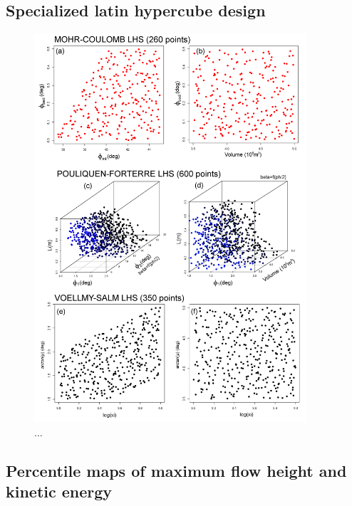 \documentclass{article}
\begin{document}
\subsection{Specialized latin hypercube design}
\newpage
\begin{figure}[H]
\centering
\includegraphics[width=0.9\textwidth]{Fig2.png}
\caption{...}
\label{Fig2}
\end{figure}

\subsection{Percentile maps of maximum flow height and kinetic energy}
\end{document}
